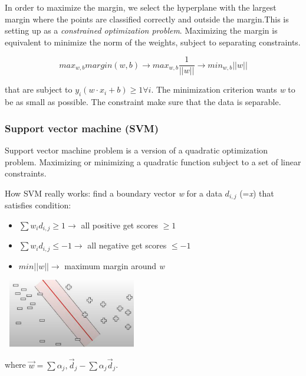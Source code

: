 \documentclass{article}
\begin{document}
In order to maximize the margin, we select the hyperplane with the largest margin where the points are classified correctly and outside the margin.This is setting up as a \emph{constrained optimization problem}. Maximizing the margin is equivalent to minimize the norm of the weights, subject to separating constraints.

\[max_{w, b} margin(w, b) \longrightarrow max_{w, b} \dfrac{1}{||w||} \longrightarrow min_{w, b} ||w||\]

that are subject to \(y_i(w\cdot x_i+b)\geq 1 \forall i\). The minimization criterion wants \emph{w} to be as small as possible. The constraint make sure that the data is separable. 
\bigskip
	
\subsubsection*{Support vector machine (SVM)}

Support vector machine problem is a version of a quadratic optimization problem. Maximizing or minimizing a quadratic function subject to a set of linear constraints.

How SVM really works: find a boundary vector \emph{w} for a data \(d_{i, j}\) (=\emph{x}) that satisfies condition:


\begin{minipage}{0.45\linewidth}
\begin{itemize}	
	\item \(\sum w_i d_{i, j} \geq 1 \longrightarrow\) all positive get scores \(\geq 1\) 
	\item \(\sum w_i d_{i, j} \leq -1 \longrightarrow\) all negative get scores \(\leq -1\) 
	\item \(min||w|| \longrightarrow\) maximum margin around \emph{w}
\end{itemize}
\end{minipage}
\hfill
\begin{minipage}{0.45\linewidth}
	\includegraphics[width=6cm, height=3cm]{img/svm.png}	
\end{minipage}



where \(\vec{w} = \sum \alpha_j, \vec{d}_j - \sum \alpha_j\vec{d}_j\).
\end{document}
